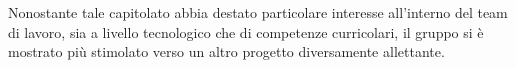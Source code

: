 Nonostante tale capitolato abbia destato particolare interesse all'interno del team di lavoro, sia a livello tecnologico che di competenze curricolari, il gruppo si è mostrato più stimolato verso un altro progetto diversamente allettante.
